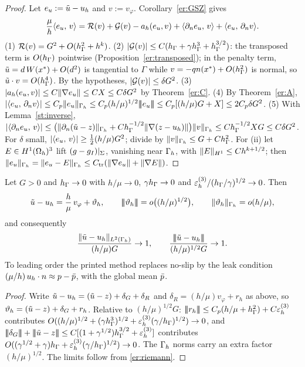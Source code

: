 \begin{proof}
Let $e_u:=\tilde u-u_h$ and $v:=v_\varphi$. Corollary~\ref{er:GSZ} gives
\[
\frac\mu h\langle e_u,\, v\rangle=\mathcal R(v)+\mathcal G(v)-a_h(e_u,v)+\langle \partial_n e_u,\, v\rangle+\langle e_u,\, \partial_n v\rangle.
\]
(1) $\mathcal R(v)=G^2+O(h_\Gamma^2+h^k)$. (2) $|\mathcal G(v)|\le C(h_\Gamma+\gamma h_\Gamma^3+h_\Gamma^{3/2})$: the transposed term is $O(h_\Gamma)$ pointwise (Proposition~\ref{er:transposed}); in the penalty term, $\tilde u=d\,W(x^\ast)+O(d^2)$ is tangential to $\Gamma$ while $v=-qn(x^\ast)+O(h_\Gamma^2)$ is normal, so $\tilde u\cdot v=O(h_\Gamma^4)$. By the hypotheses, $|\mathcal G(v)|\le\delta G^2$. (3) $|a_h(e_u,v)|\le C\lVert \nabla e_u\rVert\le CX\le C\delta G^2$ by Theorem~\ref{er:C}. (4) By Theorem~\ref{er:A}, $|\langle e_u,\, \partial_n v\rangle|\le C_p\lVert e_u\rVert_{\Gamma_h}\le C_p(h/\mu)^{1/2}|\!|\!|e_u|\!|\!|\le C_p[(h/\mu)G+X]\le2C_p\delta G^2$. (5) With Lemma~\ref{st:inverse}, $|\langle \partial_n e_u,\, v\rangle|\le\bigl(\lVert \partial_n(\tilde u-z)\rVert_{\Gamma_h}+Ch_\Gamma^{-1/2}\lVert \nabla(z-u_h)\rVert\bigr)\lVert v\rVert_{\Gamma_h}\le Ch_\Gamma^{-1/2}XG\le C\delta G^2$. For $\delta$ small, $|\langle e_u,\, v\rangle|\ge\frac12(h/\mu)G^2$; divide by $\lVert v\rVert_{\Gamma_h}\le G+Ch_\Gamma^2$. For (ii) let $E\in H^1(\Omega_h)^3$ lift $(g-g_I)|_\Sigma$, vanishing near $\Gamma_h$, with $\lVert E\rVert_{H^1}\le Ch^{k+1/2}$; then $\lVert e_u\rVert_{\Gamma_h}=\lVert e_u-E\rVert_{\Gamma_h}\le C_{\rm tr}(\lVert \nabla e_u\rVert+\lVert \nabla E\rVert)$.
\end{proof}

\begin{corollary}\label{er:Bp}
Let $G>0$ and $h_\Gamma\to0$ with $h/\mu\to0$, $\gamma h_\Gamma\to0$ and $\varepsilon_h^{(3)}/(h_\Gamma/\gamma)^{1/2}\to0$. Then
\[
\tilde u-u_h=\frac h\mu\,v_\varphi+\vartheta_h,\qquad|\!|\!|\vartheta_h|\!|\!|=o\bigl((h/\mu)^{1/2}\bigr),\qquad\lVert \vartheta_h\rVert_{\Gamma_h}=o(h/\mu),
\]
and consequently
\[
\frac{\lVert \tilde u-u_h\rVert_{L^2(\Gamma_h)}}{(h/\mu)G}\to1,\qquad\frac{|\!|\!|\tilde u-u_h|\!|\!|}{(h/\mu)^{1/2}G}\to1 .
\]
To leading order the printed method replaces no-slip by the leak condition $(\mu/h)\,u_h\cdot n\approx p-\bar p$, with the global mean $\bar p$.
\end{corollary}

\begin{proof}
Write $\tilde u-u_h=(\tilde u-z)+\delta_G+\delta_R$ and $\delta_R=(h/\mu)v_\varphi+r_h$ as above, so $\vartheta_h=(\tilde u-z)+\delta_G+r_h$. Relative to $(h/\mu)^{1/2}G$: $|\!|\!|r_h|\!|\!|\le C_p(h/\mu+h_\Gamma^2)+C\varepsilon_h^{(3)}$ contributes $O((h/\mu)^{1/2}+(\gamma h_\Gamma^3)^{1/2}+\varepsilon_h^{(3)}(\gamma/h_\Gamma)^{1/2})\to0$, and $\tnorm{\delta_G}+\tnorm{\ut-z}\le C[(1+\gamma^{1/2})\hG^{3/2}+\epsd]$ contributes $O((\gamma^{1/2}+\gamma)h_\Gamma+\varepsilon_h^{(3)}(\gamma/h_\Gamma)^{1/2})\to0$. The $\Gamma_h$ norms carry an extra factor $(h/\mu)^{1/2}$. The limits follow from \eqref{er:riemann}.
\end{proof}

